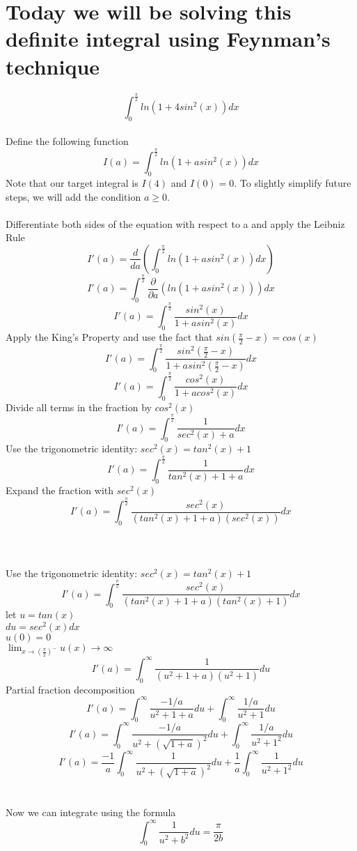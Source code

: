 \documentclass{article}
\begin{document}
\pagecolor {black}
\color{white}
\section{Today we will be solving this definite integral using Feynman's technique}

\Huge{\[\int_{0}^{\frac{\pi}{2}}ln(1+4sin^2(x))dx\]}
\\
\huge{
Define the following function
\[I(a)=\int_{0}^{\frac{\pi}{2}}ln(1+asin^2(x))dx\]
Note that our target integral is $I(4)$ and $I(0)=0$. To slightly simplify future steps, we will add the condition $a\ge0$.
\\
\\
Differentiate both sides of the equation with respect to a and apply the Leibniz Rule
\[I'(a)=\frac{d}{da}(\int_{0}^{\frac{\pi}{2}}ln(1+asin^2(x))dx)\]
\[I'(a)=\int_{0}^{\frac{\pi}{2}}\frac{\partial}{\partial a}(ln(1+asin^2(x)))dx\]
\[I'(a)=\int_{0}^{\frac{\pi}{2}}\frac{sin^2(x)}{1+asin^2(x)}dx\]
Apply the King's Property and use the fact that $sin(\frac{\pi}{2}-x)=cos(x)$
\[I'(a)=\int_{0}^{\frac{\pi}{2}}\frac{sin^2(\frac{\pi}{2}-x)}{1+asin^2(\frac{\pi}{2}-x)}dx\]
\[I'(a)=\int_{0}^{\frac{\pi}{2}}\frac{cos^2(x)}{1+acos^2(x)}dx\]
Divide all terms in the fraction by $cos^2(x)$
\[I'(a)=\int_{0}^{\frac{\pi}{2}}\frac{1}{sec^2(x)+a}dx\]
Use the trigonometric identity: $sec^2(x)=tan^2(x)+1$
\[I'(a)=\int_{0}^{\frac{\pi}{2}}\frac{1}{tan^2(x)+1+a}dx\]
Expand the fraction with $sec^2(x)$
\[I'(a)=\int_{0}^{\frac{\pi}{2}}\frac{sec^2(x)}{(tan^2(x)+1+a)(sec^2(x))}dx\]
\\
\\
\\
Use the trigonometric identity: $sec^2(x)=tan^2(x)+1$
\[I'(a)=\int_{0}^{\frac{\pi}{2}}\frac{sec^2(x)}{(tan^2(x)+1+a)(tan^2(x)+1)}dx\]
let $u=tan(x)$\\$du=sec^2(x)dx$\\$u(0)=0$\\
$\lim_{x\to(\frac{\pi}{2})^-} u(x)\to\infty$
\[I'(a)=\int_{0}^{\infty}\frac{1}{(u^2+1+a)(u^2+1)}du\]
Partial fraction decomposition
\[I'(a)=\int_{0}^{\infty}\frac{-1/a}{u^2+1+a}du+\int_{0}^{\infty}\frac{1/a}{u^2+1}du\]
\[I'(a)=\int_{0}^{\infty}\frac{-1/a}{u^2+(\sqrt{1+a})^2}du+\int_{0}^{\infty}\frac{1/a}{u^2+1^2}du\]
\[I'(a)=\frac{-1}{a}\int_{0}^{\infty}\frac{1}{u^2+(\sqrt{1+a})^2}du+\frac{1}{a}\int_{0}^{\infty}\frac{1}{u^2+1^2}du\]
\\
\\
Now we can integrate using the formula \[\int_{0}^{\infty}\frac{1}{u^2+b^2}du=\frac{\pi}{2b}\]
}
\end{document}
